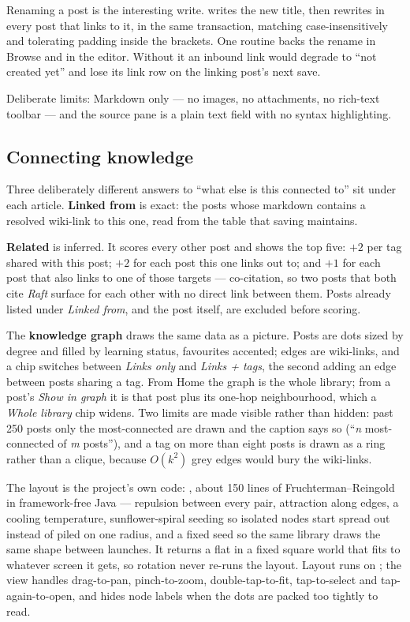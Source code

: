 Renaming a post is the interesting write.  writes the new title, then
rewrites  in every post that links to it, in the same transaction, matching
case-insensitively and tolerating padding inside the brackets. One routine backs the rename in
Browse and in the editor. Without it an inbound link would degrade to ``not created yet'' and lose
its link row on the linking post's next save.

Deliberate limits: Markdown only --- no images, no attachments, no rich-text toolbar --- and the
source pane is a plain text field with no syntax highlighting.

\subsection{Connecting knowledge}

Three deliberately different answers to ``what else is this connected to'' sit under each article.
\textbf{Linked from} is exact: the posts whose markdown contains a resolved wiki-link to this one,
read from the  table that saving maintains.

\textbf{Related} is inferred. It scores every other post and shows the top five: $+2$ per tag
shared with this post; $+2$ for each post this one links out to; and $+1$ for each post that also
links to one of those targets --- co-citation, so two posts that both cite \emph{Raft} surface for
each other with no direct link between them. Posts already listed under \emph{Linked from}, and the
post itself, are excluded before scoring.

The \textbf{knowledge graph} draws the same data as a picture. Posts are dots sized by degree and
filled by learning status, favourites accented; edges are wiki-links, and a chip switches between
\emph{Links only} and \emph{Links + tags}, the second adding an edge between posts sharing a tag.
From Home the graph is the whole library; from a post's \emph{Show in graph} it is that post plus
its one-hop neighbourhood, which a \emph{Whole library} chip widens. Two limits are made visible
rather than hidden: past 250 posts only the most-connected are drawn and the caption says so
(``\emph{n} most-connected of \emph{m} posts''), and a tag on more than eight posts is drawn as a
ring rather than a clique, because $O(k^2)$ grey edges would bury the wiki-links.

The layout is the project's own code: , about 150 lines of
Fruchterman--Reingold in framework-free Java --- repulsion between every pair, attraction along
edges, a cooling temperature, sunflower-spiral seeding so isolated nodes start spread out instead
of piled on one radius, and a fixed seed so the same library draws the same shape between launches.
It returns a flat  in a fixed square world that  fits to whatever
screen it gets, so rotation never re-runs the layout. Layout runs on ;
the view handles drag-to-pan, pinch-to-zoom, double-tap-to-fit, tap-to-select and tap-again-to-open,
and hides node labels when the dots are packed too tightly to read.

